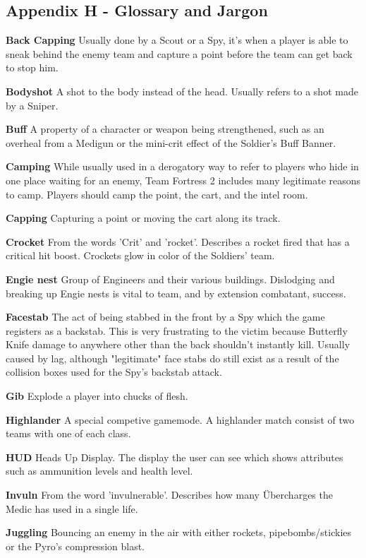 \subsection{Appendix H - Glossary and Jargon}

{\bf Back Capping} Usually done by a Scout or a Spy, it’s when a player is able to sneak behind the enemy team and capture a point before the team can get back to stop him.

{\bf Bodyshot} A shot to the body instead of the head. Usually refers to a shot made by a Sniper. 

{\bf Buff} A property of a character or weapon being strengthened, such as an overheal from a Medigun or the mini-crit effect of the Soldier's Buff Banner.

{\bf Camping} While usually used in a derogatory way to refer to players who hide in one place waiting for an enemy, Team Fortress 2 includes many legitimate reasons to camp. Players should camp the point, the cart, and the intel room.

{\bf Capping} Capturing a point or moving the cart along its track.

{\bf Crocket} From the words 'Crit' and 'rocket'. Describes a rocket fired that has a critical hit boost. Crockets glow in color of the Soldiers' team.

{\bf Engie nest} Group of Engineers and their various buildings. Dislodging and breaking up Engie nests is vital to team, and by extension combatant, success. 

{\bf Facestab} The act of being stabbed in the front by a Spy which the game registers as a backstab. This is very frustrating to the victim because Butterfly Knife damage to anywhere other than the back shouldn't instantly kill. Usually caused by lag, although "legitimate" face stabs do still exist as a result of the collision boxes used for the Spy's backstab attack. 

{\bf Gib} Explode a player into chucks of flesh.

{\bf Highlander} A special competive gamemode. A highlander match consist of two teams with one of each class.

{\bf HUD} Heads Up Display. The display the user can see which shows attributes such as ammunition levels and health level.

{\bf Invuln} From the word 'invulnerable'. Describes how many Übercharges the Medic has used in a single life.  

{\bf Juggling} Bouncing an enemy in the air with either rockets, pipebombs/stickies or the Pyro's compression blast.


